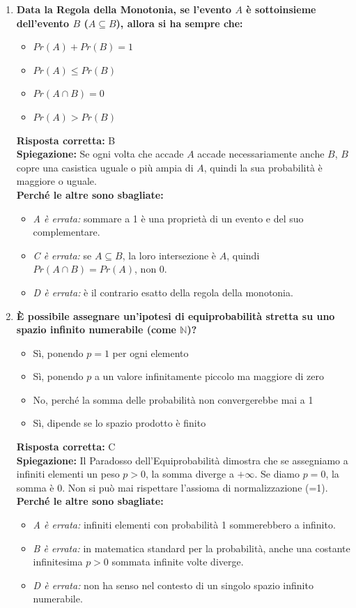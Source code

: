 \documentclass[12pt, a4paper]{article}
\begin{document}
\begin{enumerate}[label=\textbf{\arabic*.}]
    \item \textbf{Data la Regola della Monotonia, se l'evento $A$ è sottoinsieme dell'evento $B$ ($A \subseteq B$), allora si ha sempre che:}
    \begin{itemize}
        \item[A)] $Pr(A) + Pr(B) = 1$
        \item[B)] $Pr(A) \le Pr(B)$
        \item[C)] $Pr(A \cap B) = 0$
        \item[D)] $Pr(A) > Pr(B)$
    \end{itemize}
    \textbf{Risposta corretta:} B \\
    \textbf{Spiegazione:} Se ogni volta che accade $A$ accade necessariamente anche $B$, $B$ copre una casistica uguale o più ampia di $A$, quindi la sua probabilità è maggiore o uguale. \\
    \textbf{Perché le altre sono sbagliate:}
    \begin{itemize}
        \item \textit{A è errata:} sommare a 1 è una proprietà di un evento e del suo complementare.
        \item \textit{C è errata:} se $A \subseteq B$, la loro intersezione è $A$, quindi $Pr(A \cap B) = Pr(A)$, non 0.
        \item \textit{D è errata:} è il contrario esatto della regola della monotonia.
    \end{itemize}

    \item \textbf{È possibile assegnare un'ipotesi di equiprobabilità stretta su uno spazio infinito numerabile (come $\mathbb{N}$)?}
    \begin{itemize}
        \item[A)] Sì, ponendo $p=1$ per ogni elemento
        \item[B)] Sì, ponendo $p$ a un valore infinitamente piccolo ma maggiore di zero
        \item[C)] No, perché la somma delle probabilità non convergerebbe mai a 1
        \item[D)] Sì, dipende se lo spazio prodotto è finito
    \end{itemize}
    \textbf{Risposta corretta:} C \\
    \textbf{Spiegazione:} Il Paradosso dell'Equiprobabilità dimostra che se assegniamo a infiniti elementi un peso $p>0$, la somma diverge a $+\infty$. Se diamo $p=0$, la somma è 0. Non si può mai rispettare l'assioma di normalizzazione (=1). \\
    \textbf{Perché le altre sono sbagliate:}
    \begin{itemize}
        \item \textit{A è errata:} infiniti elementi con probabilità 1 sommerebbero a infinito.
        \item \textit{B è errata:} in matematica standard per la probabilità, anche una costante infinitesima $p>0$ sommata infinite volte diverge.
        \item \textit{D è errata:} non ha senso nel contesto di un singolo spazio infinito numerabile.
    \end{itemize}


\end{enumerate}
\end{document}

